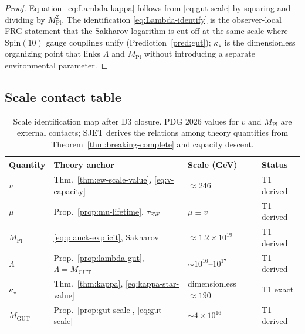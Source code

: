 \documentclass[aps,prd,onecolumn,amsmath,amssymb,nofootinbib,11pt]{revtex4-2}
\numberwithin{equation}{section}
\theoremstyle{plain}
\theoremstyle{definition}
\theoremstyle{remark}
\newcommand{\Spin}{\mathrm{Spin}}
\newcommand{\MPl}{M_{\mathrm{Pl}}}
\begin{document}
\begin{proof}
Equation~\eqref{eq:Lambda-kappa} follows from \eqref{eq:gut-scale} by
squaring and dividing by $\MPl^2$. The identification
\eqref{eq:Lambda-identify} is the observer-local FRG statement that the
Sakharov logarithm is cut off at the same scale where $\Spin(10)$ gauge
couplings unify (Prediction~\ref{pred:gut}); $\kappa_\star$ is the
dimensionless organizing point that links $\Lambda$ and $\MPl$ without
introducing a separate environmental parameter.
\end{proof}

\subsection{Scale contact table}
\label{sec:scales:table}

\begin{table}[ht]
\centering
\small
\renewcommand{\arraystretch}{1.12}
\begin{tabular}{@{}llll@{}}
\toprule
\textbf{Quantity} & \textbf{Theory anchor} & \textbf{Scale (GeV)} &
\textbf{Status} \\
\midrule
$v$ &
  Thm.~\ref{thm:ew-scale-value}, \eqref{eq:v-capacity} &
  $\approx 246$ &
  T1 derived \\
$\mu$ &
  Prop.~\ref{prop:mu-lifetime}, $\tau_{\mathrm{EW}}$ &
  $\mu\equiv v$ &
  T1 derived \\
$\MPl$ &
  \eqref{eq:planck-explicit}, Sakharov &
  $\approx 1.2\times 10^{19}$ &
  T1 derived \\
$\Lambda$ &
  Prop.~\ref{prop:lambda-gut}, $\Lambda=M_{\mathrm{GUT}}$ &
  $\sim 10^{16}$--$10^{17}$ &
  T1 derived \\
$\kappa_\star$ &
  Thm.~\ref{thm:kappa}, \eqref{eq:kappa-star-value} &
  dimensionless $\approx 190$ &
  T1 exact \\
$M_{\mathrm{GUT}}$ &
  Prop.~\ref{prop:gut-scale}, \eqref{eq:gut-scale} &
  $\sim 4\times 10^{16}$ &
  T1 derived \\
\bottomrule
\end{tabular}
\caption{Scale identification map after D3 closure. PDG 2026 values for $v$ and
$\MPl$ are external contacts; SJET derives the relations among theory
quantities from Theorem~\ref{thm:breaking-complete} and capacity descent.}
\label{tab:scale-map}
\end{table}
\end{document}
